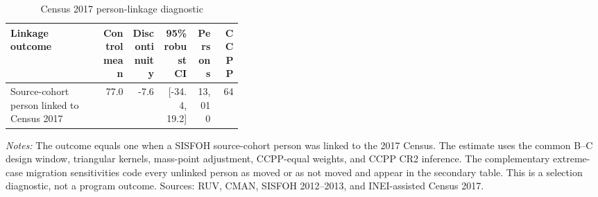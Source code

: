 \begin{table}[!htbp]
\centering
\small
\caption{Census 2017 person-linkage diagnostic}
\label{tab:rd_outcomes_linkage_2017_individual}
\begin{tabular}{p{0.39\linewidth}rrrrr}
\toprule
Linkage outcome & Control mean & Discontinuity & 95\% robust CI & Persons & CCPP \\
\midrule
Source-cohort person linked to Census 2017 & 77.0 & -7.6 & [-34.4, 19.2] & 13,010 & 64 \\
\bottomrule
\end{tabular}
\parbox{0.97\linewidth}{\footnotesize \textit{Notes:} The outcome equals one when a SISFOH source-cohort person was linked to the 2017 Census. The estimate uses the common B--C design window, triangular kernels, mass-point adjustment, CCPP-equal weights, and CCPP CR2 inference. The complementary extreme-case migration sensitivities code every unlinked person as moved or as not moved and appear in the secondary table. This is a selection diagnostic, not a program outcome. Sources: RUV, CMAN, SISFOH 2012--2013, and INEI-assisted Census 2017.}
\end{table}

